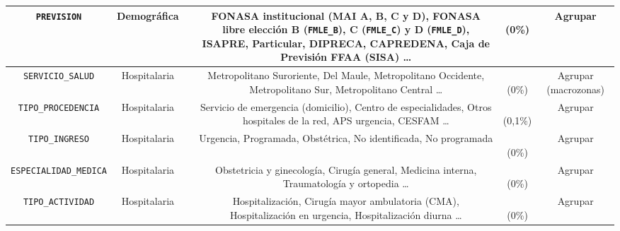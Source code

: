 \begin{table}[htbp]
\begin{tabular}{|c|c|c|c|c|c|}
\parbox[t]{2.6cm}{\raggedright \texttt{PREVISION}} &
\parbox[t]{1.5cm}{\centering Demográfica} &
\parbox[t]{1cm}{} &
\parbox[t]{4.4cm}{\raggedright FONASA institucional (MAI A, B, C y D), FONASA libre elección B (\texttt{FMLE\_B}), C (\texttt{FMLE\_C}) y D (\texttt{FMLE\_D}), ISAPRE, Particular, DIPRECA, CAPREDENA, Caja de Previsión FFAA (SISA) \ldots} &
\parbox[t]{1.4cm}{\\(0\%)} &
\parbox[t]{3cm}{\raggedright Agrupar} \\ \hline

\parbox[t]{2.6cm}{\raggedright \texttt{SERVICIO\_SALUD}} &
\parbox[t]{1.5cm}{\centering Hospitalaria} &
\parbox[t]{1cm}{} &
\parbox[t]{4.4cm}{\raggedright Metropolitano Suroriente, Del Maule, Metropolitano Occidente, Metropolitano Sur, Metropolitano Central \ldots} &
\parbox[t]{1.4cm}{\\(0\%)} &
\parbox[t]{3cm}{\raggedright Agrupar (macrozonas)} \\ \hline

\parbox[t]{2.6cm}{\raggedright \texttt{TIPO\_PROCEDENCIA}} &
\parbox[t]{1.5cm}{\centering Hospitalaria} &
\parbox[t]{1cm}{} &
\parbox[t]{4.4cm}{\raggedright Servicio de emergencia (domicilio), Centro de especialidades, Otros hospitales de la red, APS urgencia, CESFAM \ldots} &
\parbox[t]{1.4cm}{\\(0,1\%)} &
\parbox[t]{3cm}{\raggedright Agrupar} \\ \hline

\parbox[t]{2.6cm}{\raggedright \texttt{TIPO\_INGRESO}} &
\parbox[t]{1.5cm}{\centering Hospitalaria} &
\parbox[t]{1cm}{} &
\parbox[t]{4.4cm}{\raggedright Urgencia, Programada, Obstétrica, No identificada, No programada} &
\parbox[t]{1.4cm}{\\(0\%)} &
\parbox[t]{3cm}{\raggedright Agrupar} \\ \hline

\parbox[t]{2.6cm}{\raggedright \texttt{ESPECIALIDAD\_MEDICA}} &
\parbox[t]{1.5cm}{\centering Hospitalaria} &
\parbox[t]{1cm}{} &
\parbox[t]{4.4cm}{\raggedright Obstetricia y ginecología, Cirugía general, Medicina interna, Traumatología y ortopedia \ldots} &
\parbox[t]{1.4cm}{\\(0\%)} &
\parbox[t]{3cm}{\raggedright Agrupar} \\ \hline

\parbox[t]{2.6cm}{\raggedright \texttt{TIPO\_ACTIVIDAD}} &
\parbox[t]{1.5cm}{\centering Hospitalaria} &
\parbox[t]{1cm}{} &
\parbox[t]{4.4cm}{\raggedright Hospitalización, Cirugía mayor ambulatoria (CMA), Hospitalización en urgencia, Hospitalización diurna \ldots} &
\parbox[t]{1.4cm}{\\(0\%)} &
\parbox[t]{3cm}{\raggedright Agrupar} \\ \hline


\end{tabular}
\end{table}
